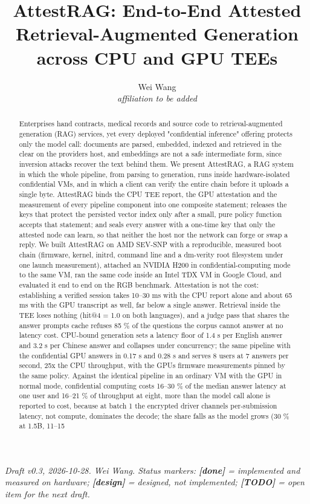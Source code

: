 \documentclass[letterpaper,twocolumn,10pt]{article}
\begin{document}
\date{}
\title{\Large \bf AttestRAG: End-to-End Attested Retrieval-Augmented Generation across CPU and GPU TEEs}
\author{{\rm Wei Wang}\\ \emph{affiliation to be added}}
\maketitle
{\small\noindent\emph{Draft v0.3, 2026-10-28. Wei Wang. Status markers: \textbf{[done]} = implemented and measured on hardware; \textbf{[design]} = designed, not implemented; \textbf{[TODO]} = open item for the next draft.}}
\begin{abstract}

Enterprises hand contracts, medical records and source code to retrieval-augmented generation (RAG) services, yet every deployed "confidential inference" offering protects only the model call: documents are parsed, embedded, indexed and retrieved in the clear on the provider\textquotesingle s host, and embeddings are not a safe intermediate form, since inversion attacks recover the text behind them. We present AttestRAG, a RAG system in which the whole pipeline, from parsing to generation, runs inside hardware-isolated confidential VMs, and in which a client can verify the entire chain before it uploads a single byte. AttestRAG binds the CPU TEE report, the GPU attestation and the measurement of every pipeline component into one composite statement; releases the keys that protect the persisted vector index only after a small, pure policy function accepts that statement; and seals every answer with a one-time key that only the attested node can learn, so that neither the host nor the network can forge or swap a reply. We built AttestRAG on AMD SEV-SNP with a reproducible, measured boot chain (firmware, kernel, initrd, command line and a dm-verity root filesystem under one launch measurement), attached an NVIDIA H200 in confidential-computing mode to the same VM, ran the same code inside an Intel TDX VM in Google Cloud, and evaluated it end to end on the RGB benchmark. Attestation is not the cost: establishing a verified session takes 10--30 ms with the CPU report alone and about 65 ms with the GPU transcript as well, far below a single answer. Retrieval inside the TEE loses nothing (hit@4 = 1.0 on both languages), and a judge pass that shares the answer prompt\textquotesingle s cache refuses 85 \% of the questions the corpus cannot answer at no latency cost. CPU-bound generation sets a latency floor of 1.4 s per English answer and 3.2 s per Chinese answer and collapses under concurrency; the same pipeline with the confidential GPU answers in 0.17 s and 0.28 s and serves 8 users at 7 answers per second, 25x the CPU throughput, with the GPU\textquotesingle s firmware measurements pinned by the same policy. Against the identical pipeline in an ordinary VM with the GPU in normal mode, confidential computing costs 16--30 \% of the median answer latency at one user and 16--21 \% of throughput at eight, more than the model call alone is reported to cost, because at batch 1 the encrypted driver channel\textquotesingle s per-submission latency, not compute, dominates the decode; the share falls as the model grows (30 \% at 1.5B, 11--15 
\end{abstract}
\end{document}
